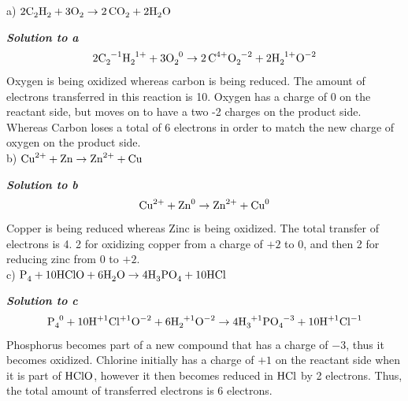 \documentclass{article}
\begin{document}
    a) $ \ce{2 C_{2}H_{2}} + \ce{3 O_{2}} \rightarrow \ce{2CO_{2}} + \ce{2 H_{2}O}$

    \textbf{\textit{Solution to a}}
    $$ \ce{2 C_{2}^{-1}H_{2}^{1+}} + \ce{3 O_{2}^{0}} \rightarrow \ce{2C^{4+}O_{2}^{-2}} + \ce{2 H_{2}^{1+}O^{-2}} $$
    Oxygen is being oxidized whereas carbon is being reduced. The amount of electrons transferred in this reaction is
    10. Oxygen has a charge of 0 on the reactant side, but moves on  to have a two -2 charges on the product side. Whereas Carbon loses a total of 6 electrons in order to match the new charge of oxygen on the product side.\\[1cm]

    b) $\ce{Cu^{2+}} + \ce{Zn} \rightarrow  \ce{Zn^{2+}} + \ce{Cu}$

    \textbf{\textit{Solution to b}}
    $$ \ce{Cu^{2+}} + \ce{Zn^{0}} \rightarrow  \ce{Zn^{2+}} + \ce{Cu^{0}} $$
    Copper is being reduced whereas Zinc is being oxidized. The total transfer of electrons is 4. 2 for oxidizing copper from a charge of $+2$ to $0$, and then 2 for reducing zinc from $0$ to $+2$.\\[1cm]

    c) $\ce{P_{4}} + \ce{10 HClO} + \ce{6 H_{2}O} \rightarrow \ce{4 H_{3}PO_{4}} + \ce{10 HCl}$

    \textbf{\textit{Solution to c}}
    $$\ce{P_{4}^{0}} + \ce{10 H^{+1}Cl^{+1}O^{-2}} + \ce{6 H_{2}^{+1}O^{-2}} \rightarrow \ce{4 H_{3}^{+1}PO_{4}^{-3}} + \ce{10 H^{+1}Cl^{-1}}$$
     Phosphorus becomes part of a new compound that has a charge of $-3$, thus it becomes oxidized. Chlorine initially has a charge of $+1$ on the reactant side when it is part of $\ce{HClO}$, however it then becomes reduced in $\ce{HCl}$ by 2 electrons. Thus, the total amount of transferred electrons is 6 electrons.
    \pagebreak
\end{document}
